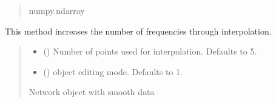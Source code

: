 \documentclass[letterpaper,10pt,english]{sphinxmanual}
\begin{document}
\begin{fulllineitems}
\begin{fulllineitems}
\begin{quote}
\begin{description}
\sphinxAtStartPar
numpy.ndarray

\end{description}\end{quote}

\end{fulllineitems}


\begin{fulllineitems}
\label{\detokenize{touchstone:touchstone.spfile.interpolate}}
\pysigstartsignatures
{}
\pysigstopsignatures
\sphinxAtStartPar
This method increases the number of frequencies through interpolation.
\begin{quote}\begin{description}
\begin{itemize}
\item {} 
\sphinxAtStartPar
{} (\sphinxstyleliteralemphasis{\sphinxupquote{, }}) \textendash{} Number of points used for interpolation. Defaults to 5.

\item {} 
\sphinxAtStartPar
{} (\sphinxstyleliteralemphasis{\sphinxupquote{, }}) \textendash{} object editing mode. Defaults to \sphinxhyphen{}1.

\end{itemize}

\sphinxAtStartPar
Network object with smooth data

\sphinxAtStartPar
{\hyperref[\detokenize{touchstone:touchstone.spfile}]{}}

\end{description}\end{quote}

\end{fulllineitems}



\end{fulllineitems}
\end{document}
